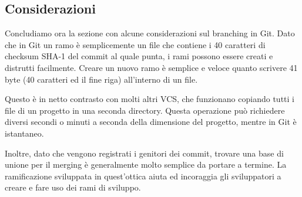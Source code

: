 \subsection{Considerazioni}
Concludiamo ora la sezione con alcune considerazioni sul branching in Git. Dato che in Git un ramo è semplicemente un file che contiene i 40 caratteri di checksum SHA-1 del commit al quale punta, i rami possono essere creati e distrutti facilmente. Creare un nuovo ramo è semplice e veloce quanto scrivere 41 byte (40 caratteri ed il fine riga) all'interno di un file.

Questo è in netto contrasto con molti altri VCS, che funzionano copiando tutti i file di un progetto in una seconda directory. Questa operazione può richiedere diversi secondi o minuti a seconda della dimensione del progetto, mentre in Git è istantaneo.

Inoltre, dato che vengono registrati i genitori dei commit, trovare una base di unione per il merging è generalmente molto semplice da portare a termine. La ramificazione sviluppata in quest'ottica aiuta ed incoraggia gli sviluppatori a creare e fare uso dei rami di sviluppo.
